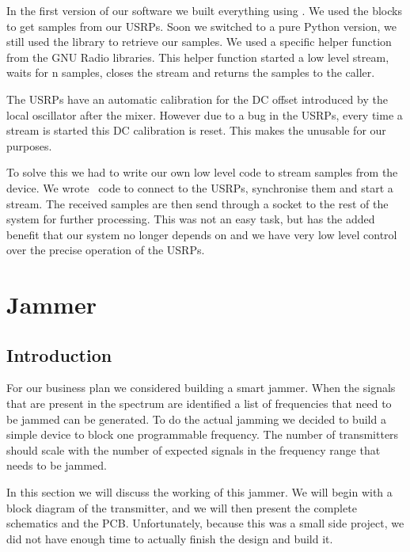 \documentclass[a4paper, openany, oneside]{memoir}
\begin{document}
In the first version of our software we built everything using . We used the  blocks to get samples from our USRPs. Soon we switched to a pure Python version, we still used the  library to retrieve our samples. We used a specific helper function  from the GNU Radio libraries. This helper function started a low level stream, waits for n samples, closes the stream and returns the samples to the caller.

The USRPs have an automatic calibration for the DC offset introduced by the local oscillator after the mixer. However due to a bug in the USRPs, every time a stream is started this DC calibration is reset. This makes the  unusable for our purposes.

To solve this we had to write our own low level code to stream samples from the device. We wrote \CC~code to connect to the USRPs, synchronise them and start a stream. The received samples are then send through a socket to the rest of the system for further processing. This was not an easy task, but has the added benefit that our system no longer depends on  and we have very low level control over the precise operation of the USRPs.

\section{Jammer}
\label{sec:jammer}

\subsection{Introduction}
For our business plan we considered building a smart jammer. When the signals that are present in the spectrum are identified a list of frequencies that need to be jammed can be generated. To do the actual jamming we decided to build a simple device to block one programmable frequency. The number of transmitters should scale with the number of expected signals in the frequency range that needs to be jammed.

In this section we will discuss the working of this jammer. We will begin with a block diagram of the transmitter, and we will then present the complete schematics and the PCB\@. Unfortunately, because this was a small side project, we did not have enough time to actually finish the design and build it.
\end{document}

